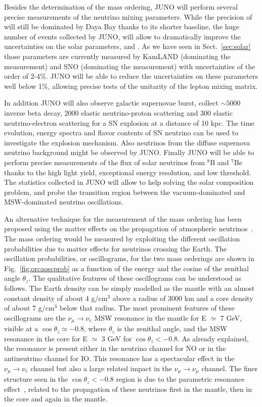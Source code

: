 Besides the determination of the mass ordering, JUNO will perform several precise measurements of the neutrino mixing parameters. While the precision of \thint will still be dominated by Daya Bay thanks to its shorter baseline, the huge number of events collected by JUNO, will allow to dramatically improve the uncertainties on the solar parameters, \thsol and \dmsqso. As we have seen in Sect.~\ref{sec:solar} those parameters are currently measured by KamLAND (dominating the \dmsqso measurement) and SNO (dominating the \thsol measurement) with uncertainties of the order of 2-4\%. JUNO will be able to reduce the uncertainties on these parameters well below 1\%, allowing precise tests of the unitarity of the lepton mixing matrix.

In addition JUNO will also observe galactic supernovae burst, collect $\sim5000$ inverse beta decay, 2000 elastic neutrino-proton scattering and 300 elastic neutrino-electron scattering for a SN explosion at a distance of 10 kpc. The time evolution, energy spectra and flavor contents of SN neutrino can be used to investigate the explosion mechanism. Also neutrinos from the diffuse supernova neutrino background might be observed by JUNO. Finally JUNO will be able to perform precise measurements of the flux of solar neutrinos from $^8$B and $^7$Be thanks to the high light yield, exceptional energy resolution, and  low threshold. The statistics collected in JUNO will allow to help solving the solar composition problem, and probe the transition region between the vacuum-dominated and MSW-dominated neutrino oscillations. 

An alternative technique for the measurement of the mass ordering has been proposed using the matter effects on the propagation of atmospheric neutrinos~\cite{razzaque}.
The mass ordering would be measured by exploiting the different oscillation probabilities due to matter effects for neutrinos crossing the Earth. The oscillation probabilities, or oscillograms, for the two mass orderings are shown in Fig.~\ref{fig:orcaoscprob} as a function of the energy and the cosine of the zenithal angle $\theta_z$.
The qualitative features of these oscillograms can be understood as follows. The Earth density can be simply modelled as the mantle with an almost constant density of about 4 g/cm$^3$ above a radius of 3000 km and a core density of about 7 g/cm$^3$ below that radius.
The most prominent features of these oscillograms are the $\nu_\mu \rightarrow \nu_e$ MSW resonance in the mantle for E $\simeq$ 7 GeV, visible at a $\cos \theta_z \simeq -0.8$, where $\theta_z$ is the zenithal angle, and  the MSW resonance in the core for 
  E $\simeq$ 3 GeV for $\cos \theta_z < -0.8$. As already explained, the resonance is present either in the neutrino channel for NO or in the antineutrino channel for IO. This resonance has a spectacular effect in the 
  $\nu_\mu \rightarrow \nu_e$ channel but also a large related impact in the $\nu_\mu \rightarrow \nu_\mu$ channel. The finer structure seen in the $\cos \theta_z < -0.8$ region is due to the parametric resonance effect~\cite{akhmedov}, related to the propagation of these neutrinos first in the mantle, then in the core and again in the mantle. 
  
